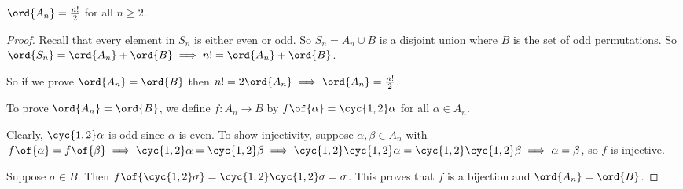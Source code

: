 \begin{theorem}
    $\ord{A_n} = \frac{n!}{2}$ for all $n \geq 2$.
\end{theorem}
\begin{proof}
    Recall that every element in $S_n$ is either even or odd. So $S_n = A_n \cup B$ is a disjoint union where $B$ is the set of odd permutations. So $\ord{S_n} = \ord{A_n} + \ord{B} \implies n! = \ord{A_n} + \ord{B}$.

    So if we prove $\ord{A_n} = \ord{B}$ then $n! = 2\ord{A_n} \implies \ord{A_n} = \frac{n!}{2}$.

    To prove $\ord{A_n} = \ord{B}$, we define $f: A_n \to B$ by $f\of{\alpha} = \cyc{1,2}\alpha$ for all $\alpha \in A_n$.

    Clearly, $\cyc{1,2}\alpha$ is odd since $\alpha$ is even. To show injectivity, suppose $\alpha, \beta \in A_n$ with $f\of{\alpha} = f\of{\beta} \implies \cyc{1,2}\alpha = \cyc{1,2}\beta \implies \cyc{1,2}\cyc{1,2}\alpha = \cyc{1,2}\cyc{1,2}\beta \implies \alpha = \beta$, so $f$ is injective.

    Suppose $\sigma \in B$. Then $f\of{\cyc{1,2}\sigma} = \cyc{1,2}\cyc{1,2}\sigma = \sigma$. This proves that $f$ is a bijection and $\ord{A_n} = \ord{B}$.
\end{proof}